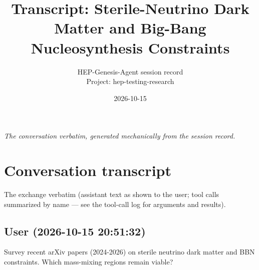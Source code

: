 \documentclass[11pt,a4paper]{article}
\title{Transcript: Sterile-Neutrino Dark Matter and Big-Bang Nucleosynthesis Constraints}
\author{HEP-Genesis-Agent session record \\ \small Project: hep-testing-research}
\date{2026-10-15}
\begin{document}
\maketitle
\noindent\textit{\small The conversation verbatim, generated mechanically from the session record.}
\vspace{1em}



\appendix
\section{Conversation transcript}
\label{app:transcript}
The exchange verbatim (assistant text as shown to the user; tool calls summarized by name --- see the tool-call log for arguments and results).
\subsection*{User \small(2026-10-15 20:51:32)}
Survey recent arXiv papers (2024-2026) on sterile neutrino dark matter and BBN constraints. Which mass-mixing regions remain viable?
\end{document}
